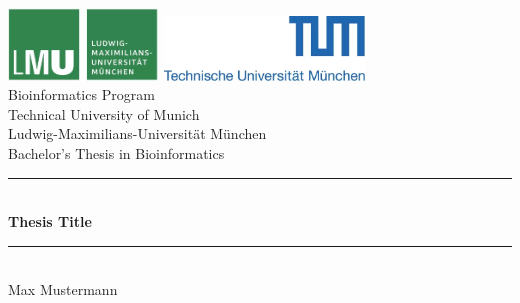 \documentclass[pdftex,12pt,a4paper]{report}
\newcommand{\HRule}{\rule{\linewidth}{0.5mm}}
\begin{document}
\begin{titlepage}

    \sffamily

    \begin{center}

        \includegraphics[width=0.3\textwidth]{logo2.png}
        \hfill
        \includegraphics[width=0.4\textwidth]{logo1.png}
        \\[5cm]

        {\Large Bioinformatics Program}\\[0.5cm]
        {\Large Technical University of Munich}\\[0.5cm]
        {\Large Ludwig-Maximilians-Universit\"at M\"unchen}\\[2cm]
        {\Large Bachelor's Thesis in Bioinformatics}\\[1.5cm]

        \HRule \\[0.4cm]
        { \huge \bfseries Thesis Title}\\[0.4cm]

        \HRule \\[1.5cm]

        {\Large Max Mustermann}\\[2.5cm]

        \vfill
    \end{center}
\end{titlepage}
\pagestyle{empty}
\end{document}
